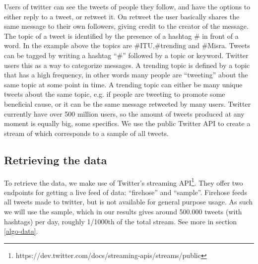 Users of twitter can see the tweets of people they follow, and have the options to either reply to a tweet, or retweet it. On retweet the user basically shares the same message to their own followers, giving credit to the creator of the message.
The topic of a tweet is identified by the presence of a hashtag \# in front of a word. In the example above the topics are \#ITU,\#trending and \#Misra.
Tweets can be tagged by writing a hashtag ``\#'' followed by a topic or keyword. Twitter users this as a way to categorize messages.
A trending topic is defined by a topic that has a high frequency, in other words many people are ``tweeting'' about the same topic at some point in time. A trending topic can either be many unique tweets about the same topic, e.g. if people are tweeting to promote some beneficial cause, or it can be the same message retweeted by many users.
Twitter currently have over 500 million users, so the amount of tweets produced at any moment is equally big, some specifics. We use the public Twitter API to create a stream of which corresponds to a sample of all tweets.

\subsection{Retrieving the data}
To retrieve the data, we make use of Twitter's streaming API\footnote{https://dev.twitter.com/docs/streaming-apis/streams/public}. They offer two endpoints for getting a live feed of data: ``firehose'' and ``sample''. Firehose feeds all tweets made to twitter, but is not available for general purpose usage. As such we will use the sample, which in our results gives around 500.000 tweets (with hashtags) per day, roughly 1/1000th of the total stream. See more in section \ref{algo-data}.

